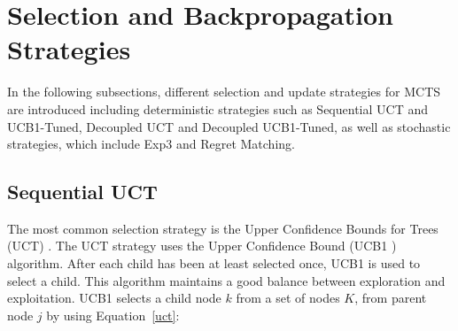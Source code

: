 \documentclass{article}
\begin{document}



\section{Selection and Backpropagation Strategies}
\label{sec:selection_strategies}

In the following subsections, different selection and update strategies for MCTS are introduced including deterministic strategies such as Sequential UCT and UCB1-Tuned, Decoupled UCT and Decoupled UCB1-Tuned, as well as stochastic strategies, which include Exp3 and Regret Matching. 

\subsection{Sequential UCT}
\label{subsec:uct}
The most common selection strategy is the Upper Confidence Bounds for Trees (UCT) \cite{kocsis}. The UCT strategy uses the Upper Confidence Bound (UCB1 \cite{auer_et_al}) algorithm. 
After each child has been at least selected once, UCB1 is used to select a child. This algorithm maintains a good balance between exploration and exploitation. UCB1 selects a child node $k$ from a set of nodes $K$, from parent node $j$ by using Equation~\ref{uct}:
\end{document}
